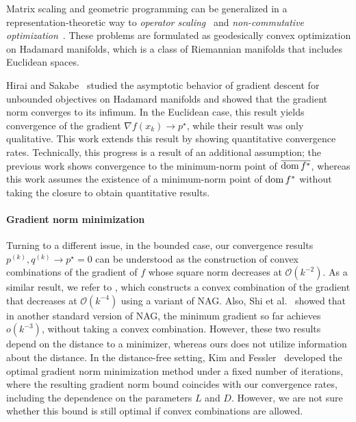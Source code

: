 \documentclass[11pt,a4paper]{article}
\theoremstyle{definition}
\theoremstyle{plain}
\newcommand{\dom}{\mathop{\rm dom}}
\begin{document}
Matrix scaling and geometric programming can be generalized in a representation-theoretic way to \textit{operator scaling}~\cite{AGLOW2018,FSG2023,GGOW2020,Gurvits2004} and \textit{non-commutative optimization}~\cite{BFGOWW2019,HNW2023}.
These problems are formulated as geodesically convex optimization on Hadamard manifolds, which is a class of Riemannian manifolds that includes Euclidean spaces.

Hirai and Sakabe~\cite{HS2024} studied the asymptotic behavior of gradient descent for unbounded objectives on Hadamard manifolds and showed that the gradient norm converges to its infimum.
In the Euclidean case, this result yields convergence of the gradient $\nabla f(x_k) \to p^\star$, while their result was only qualitative.
This work extends this result by showing quantitative convergence rates.
Technically, this progress is a result of an additional assumption; the previous work shows convergence to the minimum-norm point of $\overline{\dom f^\ast}$, whereas this work assumes the existence of a minimum-norm point of $\dom f^\ast$ without taking the closure to obtain quantitative results.

\paragraph{Gradient norm minimization}
Turning to a different issue, in the bounded case, our convergence results $p^{(k)}, q^{(k)} \to p^\star = 0$ can be understood as the construction of convex combinations of the gradient of $f$ whose square norm decreases at $\mathcal{O}(k^{-2})$.
As a similar result, we refer to \cite[Theorem~2.2.4]{Nesterov2018}, which constructs a convex combination of the gradient that decreases at $\mathcal{O}(k^{-4})$ using a variant of NAG.
Also, Shi et al.~\cite{CSY2022,SDJS2022} showed that in another standard version of NAG, the minimum gradient so far achieves $o(k^{-3})$, without taking a convex combination.
However, these two results depend on the distance to a minimizer, whereas ours does not utilize information about the distance.
In the distance-free setting, Kim and Fessler~\cite{KF2021} developed the optimal gradient norm minimization method under a fixed number of iterations, where the resulting gradient norm bound coincides with our convergence rates, including the dependence on the parameters $L$ and $D$.
However, we are not sure whether this bound is still optimal if convex combinations are allowed.
\end{document}
